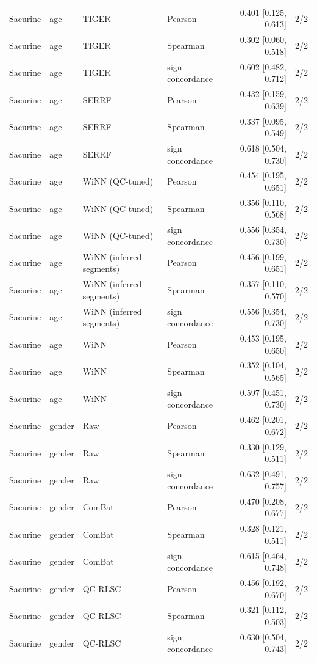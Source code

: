\begin{landscape}
\begin{longtable}{llllrr}
Sacurine & age & TIGER & Pearson & 0.401 [0.125, 0.613] & 2/2 \\
Sacurine & age & TIGER & Spearman & 0.302 [0.060, 0.518] & 2/2 \\
Sacurine & age & TIGER & sign concordance & 0.602 [0.482, 0.712] & 2/2 \\
Sacurine & age & SERRF & Pearson & 0.432 [0.159, 0.639] & 2/2 \\
Sacurine & age & SERRF & Spearman & 0.337 [0.095, 0.549] & 2/2 \\
Sacurine & age & SERRF & sign concordance & 0.618 [0.504, 0.730] & 2/2 \\
Sacurine & age & WiNN (QC-tuned) & Pearson & 0.454 [0.195, 0.651] & 2/2 \\
Sacurine & age & WiNN (QC-tuned) & Spearman & 0.356 [0.110, 0.568] & 2/2 \\
Sacurine & age & WiNN (QC-tuned) & sign concordance & 0.556 [0.354, 0.730] & 2/2 \\
Sacurine & age & WiNN (inferred segments) & Pearson & 0.456 [0.199, 0.651] & 2/2 \\
Sacurine & age & WiNN (inferred segments) & Spearman & 0.357 [0.110, 0.570] & 2/2 \\
Sacurine & age & WiNN (inferred segments) & sign concordance & 0.556 [0.354, 0.730] & 2/2 \\
Sacurine & age & WiNN & Pearson & 0.453 [0.195, 0.650] & 2/2 \\
Sacurine & age & WiNN & Spearman & 0.352 [0.104, 0.565] & 2/2 \\
Sacurine & age & WiNN & sign concordance & 0.597 [0.451, 0.730] & 2/2 \\
Sacurine & gender & Raw & Pearson & 0.462 [0.201, 0.672] & 2/2 \\
Sacurine & gender & Raw & Spearman & 0.330 [0.129, 0.511] & 2/2 \\
Sacurine & gender & Raw & sign concordance & 0.632 [0.491, 0.757] & 2/2 \\
Sacurine & gender & ComBat & Pearson & 0.470 [0.208, 0.677] & 2/2 \\
Sacurine & gender & ComBat & Spearman & 0.328 [0.121, 0.511] & 2/2 \\
Sacurine & gender & ComBat & sign concordance & 0.615 [0.464, 0.748] & 2/2 \\
Sacurine & gender & QC-RLSC & Pearson & 0.456 [0.192, 0.670] & 2/2 \\
Sacurine & gender & QC-RLSC & Spearman & 0.321 [0.112, 0.503] & 2/2 \\
Sacurine & gender & QC-RLSC & sign concordance & 0.630 [0.504, 0.743] & 2/2 \\

\end{longtable}
\end{landscape}

